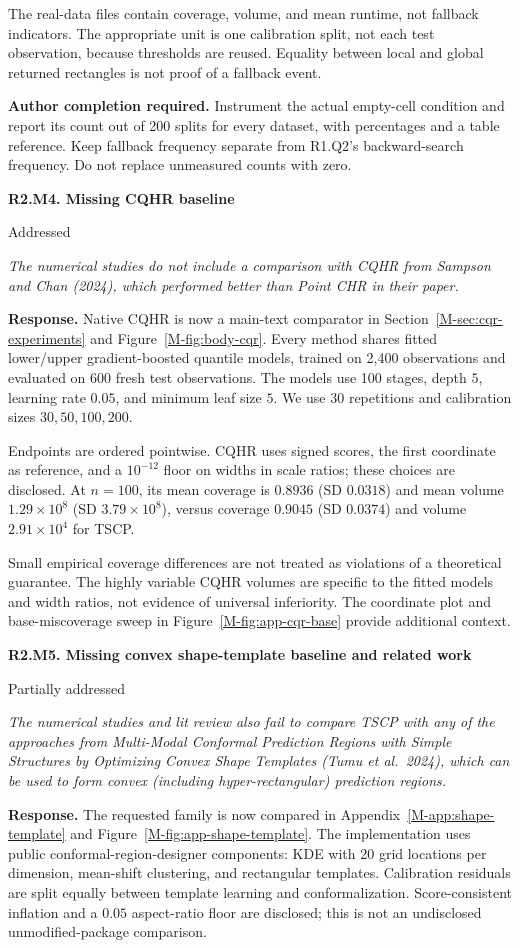 \documentclass[11pt]{article}
\newcommand{\mssec}[1]{Section~\ref*{M-#1}}
\newcommand{\msapp}[1]{Appendix~\ref*{M-#1}}
\newcommand{\msfig}[1]{Figure~\ref*{M-#1}}
\newcommand{\action}[1]{\par{\small\color{ActionRed}\textbf{Author completion required.} #1\par}}
\newcommand{\point}[3]{\par\Needspace{7\baselineskip}\medskip
\noindent\parbox[t]{0.77\linewidth}{\textbf{#1}}\hfill
\parbox[t]{0.21\linewidth}{\raggedleft\small\sffamily #2}\par\nopagebreak
{\color{ReviewerBlue}\small\itshape #3\par}\textbf{Response.} }
\begin{document}
The real-data files contain coverage, volume, and mean runtime, not fallback indicators. The appropriate unit is one calibration split, not each test observation, because thresholds are reused. Equality between local and global returned rectangles is not proof of a fallback event.

\action{Instrument the actual empty-cell condition and report its count out of 200 splits for every dataset, with percentages and a table reference. Keep fallback frequency separate from R1.Q2's backward-search frequency. Do not replace unmeasured counts with zero.}

\point{R2.M4. Missing CQHR baseline}{Addressed}{The numerical studies do not include a comparison with CQHR from
Sampson and Chan (2024), which performed better than Point CHR in
their paper.}
\label{response:R2.M4}
Native CQHR is now a main-text comparator in \mssec{sec:cqr-experiments} and \msfig{fig:body-cqr}. Every method shares fitted lower/upper gradient-boosted quantile models, trained on 2,400 observations and evaluated on 600 fresh test observations. The models use 100 stages, depth $5$, learning rate $0.05$, and minimum leaf size $5$. We use 30 repetitions and calibration sizes $30,50,100,200$.

Endpoints are ordered pointwise. CQHR uses signed scores, the first coordinate as reference, and a $10^{-12}$ floor on widths in scale ratios; these choices are disclosed. At $n=100$, its mean coverage is $0.8936$ (SD $0.0318$) and mean volume $1.29\times10^8$ (SD $3.79\times10^8$), versus coverage $0.9045$ (SD $0.0374$) and volume $2.91\times10^4$ for TSCP.

Small empirical coverage differences are not treated as violations of a theoretical guarantee. The highly variable CQHR volumes are specific to the fitted models and width ratios, not evidence of universal inferiority. The coordinate plot and base-miscoverage sweep in \msfig{fig:app-cqr-base} provide additional context.

\point{R2.M5. Missing convex shape-template baseline and related work}{Partially addressed}{The numerical studies and lit review also fail to compare TSCP with
any of the approaches from Multi-Modal Conformal Prediction Regions
with Simple Structures by Optimizing Convex Shape Templates
(Tumu et al.\ 2024), which can be used to form convex (including
hyper-rectangular) prediction regions.}
\label{response:R2.M5}
The requested family is now compared in \msapp{app:shape-template} and \msfig{fig:app-shape-template}. The implementation uses public conformal-region-designer components: KDE with 20 grid locations per dimension, mean-shift clustering, and rectangular templates. Calibration residuals are split equally between template learning and conformalization. Score-consistent inflation and a $0.05$ aspect-ratio floor are disclosed; this is not an undisclosed unmodified-package comparison.
\end{document}
